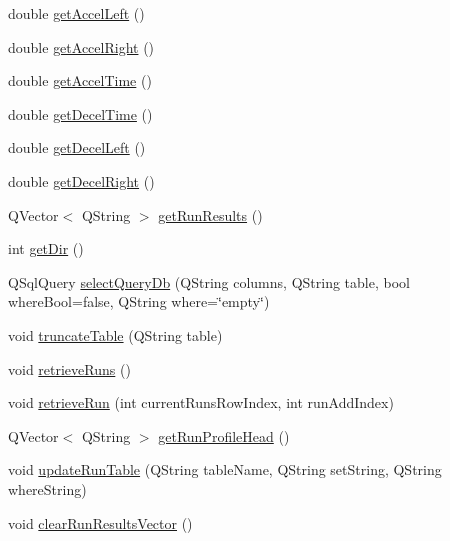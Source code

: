 \begin{DoxyCompactItemize}
double \hyperlink{class_treadmill_automation_db_i_face_acee195f59106d1c96ca0cefe00e0e3f7}{get\+Accel\+Left} ()
\item 
double \hyperlink{class_treadmill_automation_db_i_face_ad62daf9b289b6c9fa43ffe5846299408}{get\+Accel\+Right} ()
\item 
double \hyperlink{class_treadmill_automation_db_i_face_a69909558cb3eb14730a8bee5b1fe4a9f}{get\+Accel\+Time} ()
\item 
double \hyperlink{class_treadmill_automation_db_i_face_a7b8087febc0ab723b454d07c33f5aab0}{get\+Decel\+Time} ()
\item 
double \hyperlink{class_treadmill_automation_db_i_face_a8cd4911ddb9fadc6a5b9c5ad4512851e}{get\+Decel\+Left} ()
\item 
double \hyperlink{class_treadmill_automation_db_i_face_afabbddb2f0fd390c6a3109d87d843a16}{get\+Decel\+Right} ()
\item 
Q\+Vector$<$ Q\+String $>$ \hyperlink{class_treadmill_automation_db_i_face_a26ecd2a6d2099127edd5810bdd4ab72b}{get\+Run\+Results} ()
\item 
int \hyperlink{class_treadmill_automation_db_i_face_a62cebf1a91434417a4bab0fc8eb7f27e}{get\+Dir} ()
\item 
Q\+Sql\+Query \hyperlink{class_treadmill_automation_db_i_face_a4c750844b93ed48c48d76244fa40283e}{select\+Query\+Db} (Q\+String columns, Q\+String table, bool where\+Bool=false, Q\+String where=\char`\"{}empty\char`\"{})
\item 
void \hyperlink{class_treadmill_automation_db_i_face_a806259743506350c3152586229e741bd}{truncate\+Table} (Q\+String table)
\item 
void \hyperlink{class_treadmill_automation_db_i_face_a0776350cdf604faa9570329a686d4b34}{retrieve\+Runs} ()
\item 
void \hyperlink{class_treadmill_automation_db_i_face_ab18ea9e92e892e01393d6d9a597b4b13}{retrieve\+Run} (int current\+Runs\+Row\+Index, int run\+Add\+Index)
\item 
Q\+Vector$<$ Q\+String $>$ \hyperlink{class_treadmill_automation_db_i_face_a6f03f5b75ee2faf2b214cb69198db552}{get\+Run\+Profile\+Head} ()
\item 
void \hyperlink{class_treadmill_automation_db_i_face_a3257a5cace0f0f7e2094572c601f638a}{update\+Run\+Table} (Q\+String table\+Name, Q\+String set\+String, Q\+String where\+String)
\item 
void \hyperlink{class_treadmill_automation_db_i_face_a44f6713e4eb6f55d8e862c7005f77e55}{clear\+Run\+Results\+Vector} ()

\end{DoxyCompactItemize}
